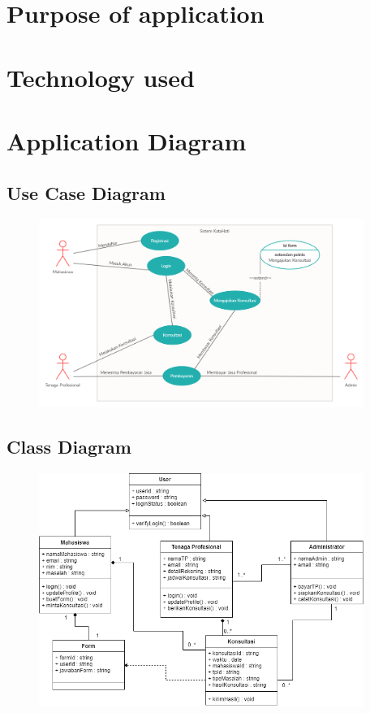 \documentclass{article}
\begin{document}
	\section{Purpose of application}
	\section{Technology used}
	
	\section{Application Diagram}

	\subsection{Use Case Diagram}
	\begin{figure}[H]
		\centering
		\includegraphics[width=400px]{Use Case Kata Hati.png}
	\end{figure}

	\subsection{Class Diagram}
	\begin{figure}[H]
		\centering
		\includegraphics[width=400px]{class_diagram.png}
	\end{figure}
\end{document}

